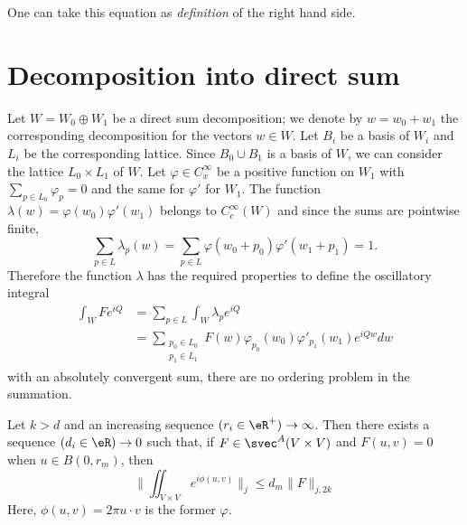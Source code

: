 One can take this equation as \emph{definition} of the right hand side.

\section{Decomposition into direct sum}

Let $W=W_0\oplus W_1$ be a direct sum decomposition; we denote by $w=w_0+w_1$ the corresponding decomposition for the vectors $w\in W$. Let $B_i$ be a basis of $W_i$ and $L_i$ be the corresponding lattice. Since $B_0\cup B_1$ is a basis of $W$, we can consider the lattice $L_0\times L_1$ of $W$. Let $\varphi\in C^{\infty}_x$ be a positive function on $W_1$ with $\sum_{p\in L_0}\varphi_p=0$ and the same for $\varphi'$ for $W_1$. The function $\lambda(w)=\varphi(w_0)\varphi'(w_1)$ belongs to $C^{\infty}_c(W)$ and since the sums are pointwise finite,
\[ 
  \sum_{p\in L}\lambda_p(w)=\sum_{p\in L}\varphi(w_0+p_0)\varphi'(w_1+p_1)=1.
\]
Therefore the function $\lambda$ has the required properties to define the oscillatory integral
\begin{equation}  \label{eq:osc_int_phip}
\begin{split}
    \int_WFe^{iQ}&=\sum_{p\in L}\int_W\lambda_pe^{iQ}\\
                 &=\sum_{\substack{p_0\in L_0\\p_1\in L_1}}F(w)\varphi_{p_0}(w_0)\varphi'_{p_1}(w_1)e^{iQw}dw
\end{split}
\end{equation}
with an absolutely convergent sum, there are no ordering problem in the summation.

\begin{proposition}
Let $k>d$ and an increasing sequence $(r_i\in\eR^+)\to\infty$. Then there exists a sequence $(d_i\in\eR)\to 0$ such that, if $F\in\svec^A(V\times V)$ and $F(u,v)=0$ when $u\in B(0,r_m)$,  then
\[ 
  \| \iint_{V\times V}e^{i\phi(u,v)} \|_j\leq d_m\| F \|_{j,2k}
\]
Here, $\phi(u,v)=2\pi u\cdot v$ is the former $\varphi$.
\end{proposition}

